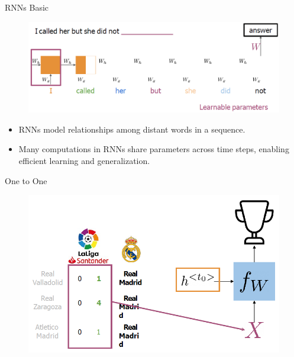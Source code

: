 \begin{frame}{RNNs Basic}
    \begin{figure}
        \centering
        \includegraphics[width=\linewidth]{images/nlp/rnn-basic.png}
    \end{figure}

    \begin{itemize}
        \item RNNs model relationships among distant words in a sequence.
        \item Many computations in RNNs share parameters across time steps, enabling efficient learning and generalization.
    \end{itemize}
\end{frame}

\begin{frame}{One to One}
    \begin{figure}
        \centering
        \includegraphics[width=\linewidth, height=0.9\textheight,keepaspectratio]{images/nlp/rnn-one2one.png}
    \end{figure}
\end{frame}

